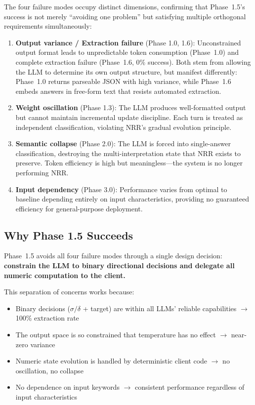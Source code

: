 \documentclass[11pt,a4paper]{article}
\begin{document}
The four failure modes occupy distinct dimensions, confirming that Phase~1.5's
success is not merely ``avoiding one problem'' but satisfying multiple orthogonal
requirements simultaneously:

\begin{enumerate}
    \item \textbf{Output variance / Extraction failure} (Phase 1.0, 1.6):
    Unconstrained output format leads to unpredictable token consumption
    (Phase~1.0) and complete extraction failure (Phase~1.6, 0\% success).
    Both stem from allowing the LLM to determine its own output structure,
    but manifest differently: Phase~1.0 returns parseable JSON with high
    variance, while Phase~1.6 embeds answers in free-form text that resists
    automated extraction.

    \item \textbf{Weight oscillation} (Phase 1.3): The LLM produces well-formatted
    output but cannot maintain incremental update discipline. Each turn is treated
    as independent classification, violating NRR's gradual evolution principle.

    \item \textbf{Semantic collapse} (Phase 2.0): The LLM is forced into
    single-answer classification, destroying the multi-interpretation state
    that NRR exists to preserve. Token efficiency is high but meaningless---the
    system is no longer performing NRR.

    \item \textbf{Input dependency} (Phase 3.0): Performance varies from optimal
    to baseline depending entirely on input characteristics, providing no
    guaranteed efficiency for general-purpose deployment.
\end{enumerate}

\subsection{Why Phase 1.5 Succeeds}

Phase~1.5 avoids all four failure modes through a single design decision:
\textbf{constrain the LLM to binary directional decisions and delegate all
numeric computation to the client.}

This separation of concerns works because:
\begin{itemize}
    \item Binary decisions ($\sigma/\delta$ + target) are within all LLMs'
    reliable capabilities $\rightarrow$ 100\% extraction rate
    \item The output space is so constrained that temperature has no effect
    $\rightarrow$ near-zero variance
    \item Numeric state evolution is handled by deterministic client code
    $\rightarrow$ no oscillation, no collapse
    \item No dependence on input keywords $\rightarrow$ consistent performance
    regardless of input characteristics
\end{itemize}
\end{document}
